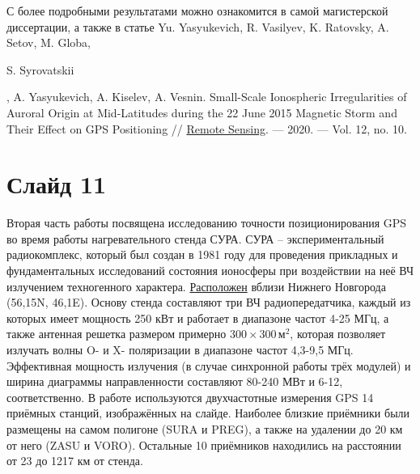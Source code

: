 \documentclass[a4paper,14pt]{extarticle}
\begin{document}
С более подробными результатами можно ознакомится в самой магистерской диссертации, а также в статье Yu. Yasyukevich, R. Vasilyev, K. Ratovsky, A. Setov, M. Globa, \begin{bf}S. Syrovatskii\end{bf}, A. Yasyukevich, A. Kiselev, A. Vesnin. Small-Scale Ionospheric Irregularities of Auroral Origin at Mid-Latitudes during the 22 June 2015 Magnetic Storm and Their Effect on GPS Positioning // \href{http://dx.doi.org/10.3390/rs12101579}{Remote Sensing}. --- 2020. --- Vol. 12, no. 10. 

\section*{Слайд 11}
Вторая часть работы посвящена исследованию точности позиционирования GPS во время работы нагревательного стенда СУРА.
СУРА -- экспериментальный радиокомплекс, который был создан в 1981 году для проведения прикладных и фундаментальных исследований состояния ионосферы при воздействии на неё ВЧ излучением техногенного характера.
\href{https://clck.ru/NfWnc}{Расположен} вблизи Нижнего Новгорода (56,15\degree N, 46,1\degree E).
Основу стенда составляют три ВЧ радиопередатчика, каждый из которых имеет мощность 250 кВт и работает в диапазоне частот 4-25 МГц, а также антенная решетка размером примерно $300\times300\,\text{м}^2$, которая позволяет излучать волны O- и X- поляризации в диапазоне частот 4,3-9,5 МГц.
Эффективная мощность излучения (в случае синхронной работы трёх модулей) и ширина диаграммы направленности составляют 80-240 МВт и 6-12\degree, соответственно.
В работе используются двухчастотные измерения GPS 14 приёмных станций, изображённых на слайде.
Наиболее близкие приёмники были размещены на самом полигоне (SURA и PREG), а также на удалении до 20 км от него (ZASU и VORO).
Остальные 10 приёмников находились на расстоянии от 23 до 1217 км от стенда.
\end{document}
